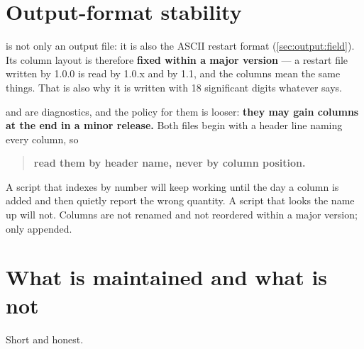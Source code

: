 \section{Output-format stability}
\label{sec:policy:outputs}

 is not only an output file: it is also the ASCII restart
format (\cref{sec:output:field}). Its column layout is therefore \textbf{fixed
within a major version} --- a restart file written by 1.0.0 is read by 1.0.x
and by 1.1, and the columns mean the same things. That is also why it is
written with 18 significant digits whatever  says.

 and  are diagnostics, and the policy for
them is looser: \textbf{they may gain columns at the end in a minor release.}
Both files begin with a header line naming every column, so

\begin{quote}
  \textbf{read them by header name, never by column position.}
\end{quote}

A script that indexes  by number will keep working until the
day a column is added and then quietly report the wrong quantity. A script that
looks the name up will not. Columns are not renamed and not reordered within a
major version; only appended.

\section{What is maintained and what is not}
\label{sec:policy:support}

Short and honest.

